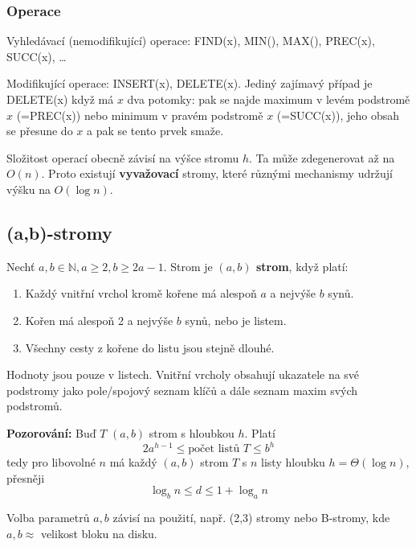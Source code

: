 \documentclass[11pt]{report} %
\newcommand{\N}{\mathbb{N}}
\numberwithin{equation}{section}
\begin{document}
\subsubsection{Operace}
Vyhledávací (nemodifikující) operace: FIND(x), MIN(), MAX(), PREC(x), SUCC(x), \dots

Modifikující operace: INSERT(x), DELETE(x). Jediný zajímavý případ je DELETE(x) když má $x$ dva potomky: pak se najde maximum v levém podstromě $x$ (=PREC(x)) nebo minimum v pravém podstromě $x$ (=SUCC(x)), jeho obsah se přesune do $x$ a pak se tento prvek smaže.
	
Složitost operací obecně závisí na výšce stromu $h$. Ta může zdegenerovat až na $O(n)$. Proto existují \textbf{vyvažovací} stromy, které různými mechanismy udržují výšku na $O(\log n)$.


\subsection{(a,b)-stromy}
Nechť $a, b \in \N, a \geq 2, b \geq 2a-1$. Strom je \textbf{$(a, b)$ strom}, když platí:
\begin{enumerate}
	
	
	\item Každý vnitřní vrchol kromě kořene má alespoň $a$ a nejvýše $b$ synů.
	\item Kořen má alespoň 2 a nejvýše $b$ synů, nebo je listem.
	\item Všechny cesty z kořene do listu jsou stejně dlouhé.
\end{enumerate}

Hodnoty jsou pouze v listech. Vnitřní vrcholy obsahují ukazatele na své podstromy jako pole/spojový seznam klíčů a dále seznam maxim svých podstromů.

\noindent\textbf{Pozorování:} Buď $T$ $(a, b)$ strom s hloubkou $h$. Platí 
$$2a^{h-1} \leq \text{počet listů } T \leq b^h$$
tedy pro libovolné $n$ má každý $(a, b)$ strom $T$ s $n$ listy hloubku $h = \Theta(\log n)$, přesněji
$$\log_b n \leq d \leq 1 + \log_a n$$

Volba parametrů $a,b$ závisí na použití, např. (2,3) stromy nebo B-stromy, kde $a,b \approx $ velikost bloku na disku.
\end{document}
